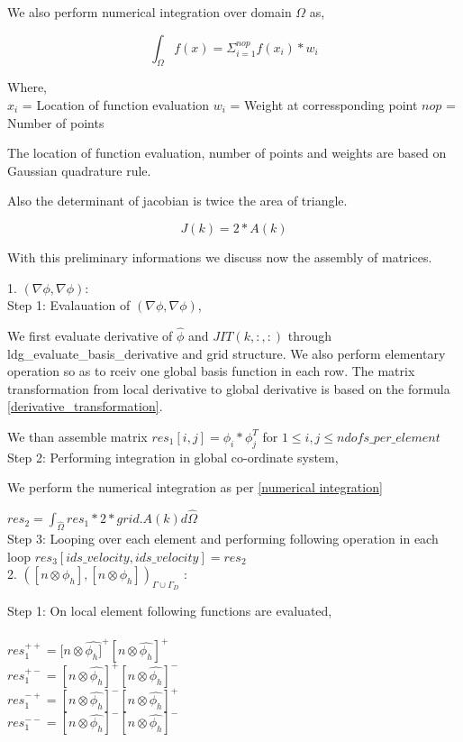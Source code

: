 \documentclass[a4paper,12pt]{book}
\begin{document}
We also perform numerical integration over domain $\Omega$ as,

\begin{equation}\label{numerical integration}
\int_{\Omega} f(x) = \Sigma_{i=1}^{nop} f(x_i) * w_i
\end{equation}

Where, \\

$x_i$ = Location of function evaluation
$w_i$ = Weight at corressponding point
$nop$ = Number of points

The location of function evaluation, number of points and weights are based on Gaussian quadrature rule.

Also the determinant of jacobian is twice the area of triangle.

\begin{equation}\label{determinant to area}
J(k) = 2*A(k)
\end{equation}

With this preliminary informations we discuss now the assembly of matrices.

1. $(\nabla \phi, \nabla \phi)$:\\

Step 1: Evalauation of $(\nabla \phi , \nabla \phi)$,

We first evaluate derivative of $\hat{\phi}$ and $JIT(k,:,:)$ through ldg\_evaluate\_basis\_derivative and grid structure. We also perform elementary operation so as to rceiv one global basis function in each row. The matrix transformation from local derivative to global derivative is based on the formula \ref{derivative_transformation}.

We than assemble matrix $res_1[i,j]=\phi_i*\phi_j^T$ for $1 \leq i,j \leq ndofs\_per\_element$\\

Step 2: Performing integration in global co-ordinate system,

We perform the numerical integration as per \ref{numerical integration} 

$res_2 = \int_{\hat{\Omega}} res_1 *2*grid.A(k)  d \hat{\Omega}$\\

Step 3: Looping over each element and performing following operation in each loop $res_3[ids\_velocity,ids\_velocity]=res_2$\\


2. $([n \otimes \phi_h], [n \otimes \phi_h])_{\Gamma \cup \Gamma_D}$ :

Step 1: On local element following functions are evaluated,\\
\\
$res_1^{++} = [n \otimes \hat{\phi_h]}^+ [n \otimes \hat{\phi_h}]^+$\\
$res_1^{+-} = [n \otimes \hat{\phi_h}]^+ [n \otimes \hat{\phi_h}]^-$\\
$res_1^{-+} = [n \otimes \hat{\phi_h}]^- [n \otimes \hat{\phi_h}]^+$\\
$res_1^{--} = [n \otimes \hat{\phi_h}]^- [n \otimes \hat{\phi_h}]^-$\\
\end{document}
